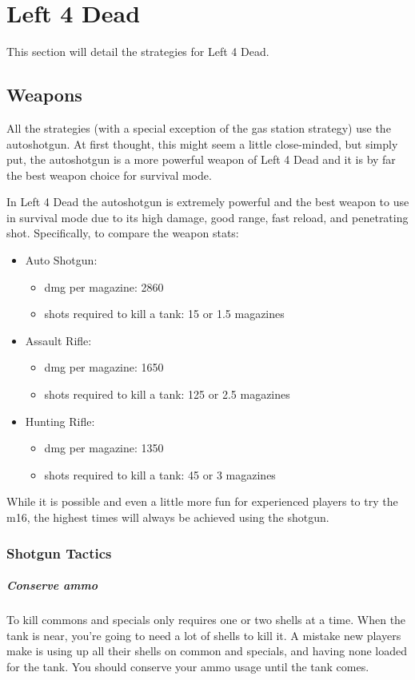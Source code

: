\chapter{Left 4 Dead}
This section will detail the strategies for Left 4 Dead.

\section{Weapons}
All the strategies (with a special exception of the gas station strategy) use the autoshotgun. At first thought, this might seem a little close-minded, but simply put, the autoshotgun is a more powerful weapon of Left 4 Dead and it is by far the best weapon choice for survival mode.

In Left 4 Dead the autoshotgun is extremely powerful and the best weapon to use in survival mode due to its high damage, good range, fast reload, and penetrating shot. Specifically, to compare the weapon stats:

\begin{itemize}
\item Auto Shotgun:
\begin{itemize}
\item dmg per magazine: 2860
\item shots required to kill a tank: 15 or 1.5 magazines
\end{itemize}
\item Assault Rifle:
\begin{itemize}
\item dmg per magazine: 1650
\item shots required to kill a tank: 125 or 2.5 magazines
\end{itemize}
\item Hunting Rifle:
\begin{itemize}
\item dmg per magazine: 1350
\item shots required to kill a tank: 45 or 3 magazines
\end{itemize}
\end{itemize}

While it is possible and even a little more fun for experienced players to try the m16, the highest times will always be achieved using the shotgun.

\subsection{Shotgun Tactics}
\paragraph{Conserve ammo}
To kill commons and specials only requires one or two shells at a time. When the tank is near, you're going to need a lot of shells to kill it. A mistake new players make is using up all their shells on common and specials, and having none loaded for the tank. You should conserve your ammo usage until the tank comes.

